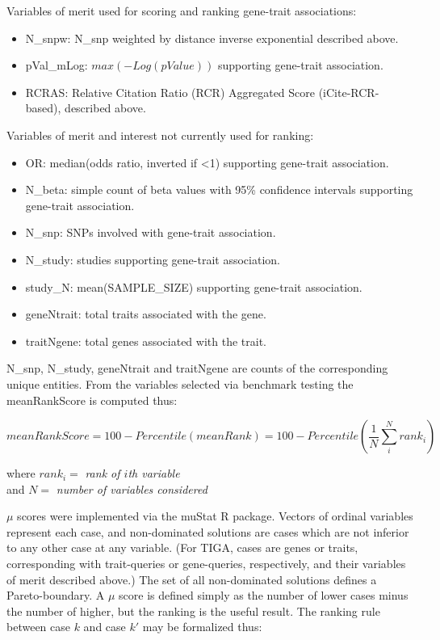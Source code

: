 Variables of merit used for scoring and ranking gene-trait associations:

\begin{itemize}
\item N\_snpw: N\_snp weighted by distance inverse exponential described above.
\item pVal\_mLog: $max(-Log(pValue))$ supporting gene-trait association.
\item RCRAS: Relative Citation Ratio (RCR) Aggregated Score (iCite-RCR-based), described above.
\end{itemize}

Variables of merit and interest not currently used for ranking:

\begin{itemize}
\item OR: median(odds ratio, inverted if <1) supporting gene-trait association.
\item N\_beta: simple count of beta values with 95\% confidence intervals supporting gene-trait association.
\item N\_snp: SNPs involved with gene-trait association.
\item N\_study: studies supporting gene-trait association.
\item study\_N: mean(SAMPLE\_SIZE) supporting gene-trait association.
\item geneNtrait: total traits associated with the gene.
\item traitNgene: total genes associated with the trait.
\end{itemize}

N\_snp, N\_study, geneNtrait and traitNgene are counts of the corresponding unique entities. From the variables selected via benchmark testing the meanRankScore is computed thus:

\begin{equation}
    meanRankScore = 100 - Percentile(meanRank) = 100 - Percentile(\frac{1}{N} \sum_{i}^{N} rank_{i})
\end{equation}

\begin{center}
    where $ rank_{i} = $ \emph{rank of $ i $th variable}\\
    and $ N = $ \emph{number of variables considered}
\end{center}

$\mu$ scores were implemented via the muStat\cite{Wittkowski2012-fk} R package. Vectors of ordinal variables represent each case, and non-dominated solutions are cases which are not inferior to any other case at any variable. (For TIGA, cases are genes or traits, corresponding with trait-queries or gene-queries, respectively, and their variables of merit described above.) The set of all non-dominated solutions defines a Pareto-boundary. A $\mu$ score is defined simply as the number of lower cases minus the number of higher, but the ranking is the useful result. The ranking rule between case $k$ and case $k'$ may be formalized thus:

